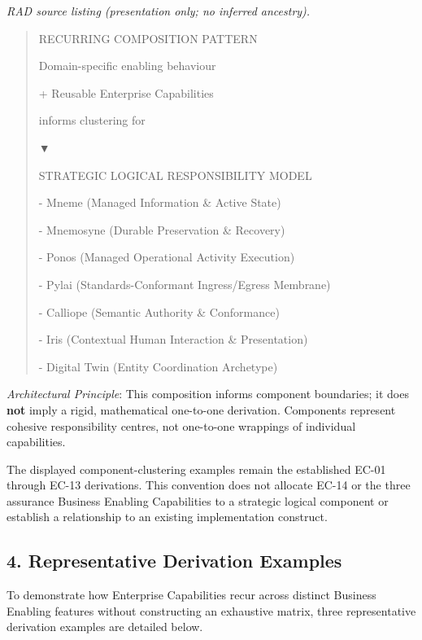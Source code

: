 \textit{RAD source listing (presentation only; no inferred ancestry).}
\begin{quote}
RECURRING COMPOSITION PATTERN

Domain-specific enabling behaviour

+ Reusable Enterprise Capabilities

informs clustering for

▼

STRATEGIC LOGICAL RESPONSIBILITY MODEL

- Mneme (Managed Information \& Active State)

- Mnemosyne (Durable Preservation \& Recovery)

- Ponos (Managed Operational Activity Execution)

- Pylai (Standards-Conformant Ingress/Egress Membrane)

- Calliope (Semantic Authority \& Conformance)

- Iris (Contextual Human Interaction \& Presentation)

- Digital Twin (Entity Coordination Archetype)
\end{quote}
\label{rad:tier-model:182}

\emph{Architectural Principle}: This composition informs component boundaries; it does \textbf{not} imply a rigid, mathematical one-to-one derivation. Components represent cohesive responsibility centres, not one-to-one wrappings of individual capabilities.

\label{rad:tier-model:184}

The displayed component-clustering examples remain the established EC-01 through EC-13 derivations. This convention does not allocate EC-14 or the three assurance Business Enabling Capabilities to a strategic logical component or establish a relationship to an existing implementation construct.

\label{rad:tier-model:186}

\par\smallskip
{}\label{rad:tier-model:188}
\subsection*{4. Representative Derivation Examples}
\label{rad:tier-model:190}

To demonstrate how Enterprise Capabilities recur across distinct Business Enabling features without constructing an exhaustive matrix, three representative derivation examples are detailed below.

